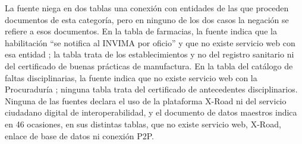La fuente niega en dos tablas una conexión con entidades de las que proceden documentos de esta categoría, pero en ninguno de los dos casos la negación se refiere a esos documentos. En la tabla de farmacias, la fuente indica que la habilitación \enquote{se notifica al INVIMA por oficio} y que no existe servicio web con esa entidad \parencite[p.~3]{gobernaciondelhuila2026datosmaestros}; la tabla trata de los establecimientos y no del registro sanitario ni del certificado de buenas prácticas de manufactura. En la tabla del catálogo de faltas disciplinarias, la fuente indica que no existe servicio web con la Procuraduría \parencite[p.~5]{gobernaciondelhuila2026datosmaestros}; ninguna tabla trata del certificado de antecedentes disciplinarios. Ninguna de las fuentes declara el uso de la plataforma X-Road ni del servicio ciudadano digital de interoperabilidad, y el documento de datos maestros indica en 46 ocasiones, en sus distintas tablas, que no existe servicio web, X-Road, enlace de base de datos ni conexión P2P.

